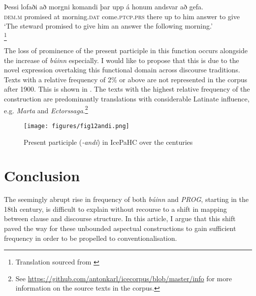 \documentclass[output=paper,colorlinks,citecolor=brown]{langscibook}
\begin{document}
\ea\label{ex:andi}
\gll Þessi lofaði að morgni komandi þar upp á
honum andsvar að gefa. \\ \textsc{dem.m} promised at morning.\textsc{dat} come.\textsc{ptcp.prs} there up to him answer to give\\
\glt `The steward promised to give him an answer the following morning.' \\ \hfill \citep[262]{olafsson1908aefisaga}\footnote{Translation sourced from \citet[83]{phillpotts2017life}}
\z

The loss of prominence of the present participle in this function occurs alongside the increase of \textit{búinn} especially. I would like to propose that this is due to the novel expression overtaking this functional domain across discourse traditions. Texts with a relative frequency of 2\% or above are not represented in the corpus after 1900. This is shown in . The texts with the highest relative frequency of the construction are predominantly translations with considerable Latinate influence, e.g. \textit{Marta} and \textit{Ectorssaga}.\footnote{See \url{https://github.com/antonkarl/icecorpus/blob/master/info} for more information on the source texts in the corpus.}

 \begin{figure}
    \centering
    \texttt{[image: figures/fig12andi.png]}
    \caption{Present participle (\textit{-andi}) in IcePaHC over the centuries}\label{fig:andi}
\end{figure}

\section{Conclusion}\label{sec:Chark6}


The seemingly abrupt rise in frequency of both \textit{búinn} and \textit{PROG}, starting in the 18th century, is difficult to explain without recourse to a shift in mapping between clause and discourse structure. In this article, I argue that this shift paved the way for these unbounded aspectual constructions to gain sufficient frequency in order to be propelled to conventionalisation.
\end{document}
